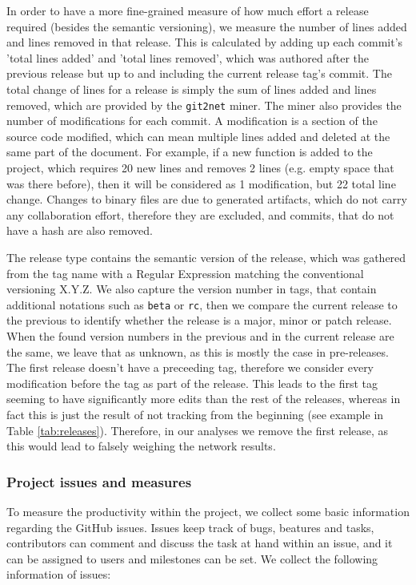 In order to have a more fine-grained measure of how much effort a release required (besides the semantic versioning), we measure the number of lines added and lines removed in that release. This is calculated by adding up each commit's 'total lines added' and 'total lines removed', which was authored after the previous release but up to and including the current release tag's commit. The total change of lines for a release is simply the sum of lines added and lines removed, which are provided by the \texttt{git2net} miner. The miner also provides the number of modifications for each commit. A modification is a section of the source code modified, which can mean multiple lines added and deleted at the same part of the document. For example, if a new function is added to the project, which requires 20 new lines and removes 2 lines (e.g. empty space that was there before), then it will be considered as 1 modification, but 22 total line change. Changes to binary files are due to generated artifacts, which do not carry any collaboration effort, therefore they are excluded, and commits, that do not have a hash are also removed.

The release type contains the semantic version of the release, which was gathered from the tag name with a Regular Expression matching the conventional versioning X.Y.Z. We also capture the version number in tags, that contain additional notations such as \texttt{beta} or \texttt{rc}, then we compare the current release to the previous to identify whether the release is a major, minor or patch release. When the found version numbers in the previous and in the current release are the same, we leave that as unknown, as this is mostly the case in pre-releases. The first release doesn't have a preceeding tag, therefore we consider every modification before the tag as part of the release. This leads to the first tag seeming to have significantly more edits than the rest of the releases, whereas in fact this is just the result of not tracking from the beginning (see example in Table \ref{tab:releases}). Therefore, in our analyses we remove the first release, as this would lead to falsely weighing the network results.



\subsubsection{Project issues and measures}
\label{sec:project_issues}

To measure the productivity within the project, we collect some basic information regarding the GitHub issues. Issues keep track of bugs, beatures and tasks, contributors can comment and discuss the task at hand within an issue, and it can be assigned to users and milestones can be set. We collect the following information of issues:

